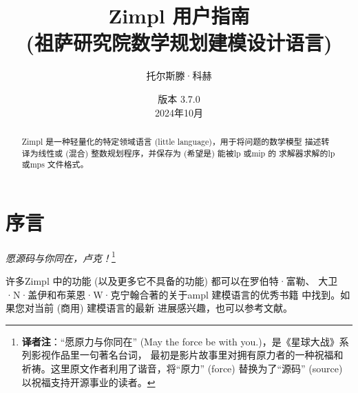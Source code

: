 \documentclass[11pt]{ctexart} %
\newcommand{\zimpl}{{\sc Zimpl}\xspace}
\newcommand{\lp}{{\sc lp}\xspace}
\newcommand{\mip}{{\sc mip}\xspace}
\newcommand{\mps}{{\sc mps}\xspace}
\newcommand{\lpf}{{\sc lp}\xspace}
\newcommand{\ampl}{{\sc ampl}\xspace}
\begin{document}

\title{
\LARGE\zimpl 用户指南\\
\normalsize (祖萨研究院数学规划建模设计语言)\\
}
\author{托尔斯滕·科赫}
\date{\small 版本 3.7.0\\2024年10月}
\maketitle
%
\tableofcontents
\newpage
\begin{abstract}
  \zimpl 是一种轻量化的特定领域语言 (little language)，用于将问题的数学模型
  描述转译为线性或 (混合) 整数规划程序，并保存为 (希望是) 能被\lp 或\mip 的
  求解器求解的\lpf 或\mps 文件格式。
\end{abstract}


\section{序言}
\begin{flushright}
{\em 愿源码与你同在，卢克！}\footnote{\textbf{译者注}：“愿原力与你同在” 
(May the force be with you.)，是《星球大战》系列影视作品里一句著名台词，
最初是影片故事里对拥有原力者的一种祝福和祈祷。这里原文作者利用了谐音，将“原力”
(force) 替换为了“源码” (source) 以祝福支持开源事业的读者。}
\end{flushright}
许多\zimpl 中的功能 (以及更多它不具备的功能) 都可以在罗伯特·富勒、
大卫·N·盖伊和布莱恩·W·克宁翰合著的关于\ampl 建模语言的优秀书籍
\cite{FourierGayKernighan2003} 中找到。如果您对当前 (商用) 建模语言的最新
进展感兴趣，也可以参考文献\cite{Kallrath2004}。
\end{document}
